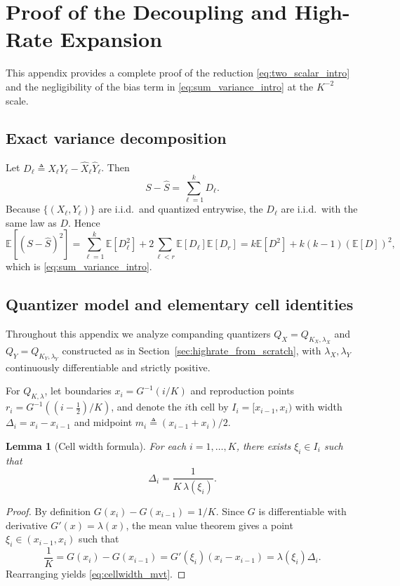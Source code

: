 \documentclass{article}
\newtheorem{lemma}{Lemma}
\newcommand{\E}{\mathbb{E}}
\newcommand{\defeq}{\triangleq}
\begin{document}

\newpage
\appendix

\section{Proof of the Decoupling and High-Rate Expansion}\label{app:proof_decoupling}
This appendix provides a complete proof of the reduction \eqref{eq:two_scalar_intro} and the negligibility of the bias term in \eqref{eq:sum_variance_intro} at the $K^{-2}$ scale.

\subsection{Exact variance decomposition}
Let $D_\ell \defeq X_\ell Y_\ell - \widehat X_\ell \widehat Y_\ell$. Then
\[
S-\widehat S=\sum_{\ell=1}^k D_\ell.
\]
Because $\{(X_\ell,Y_\ell)\}$ are i.i.d.\ and quantized entrywise, the $D_\ell$ are i.i.d.\ with the same law as $D$. Hence
\[
\E[(S-\widehat S)^2]
=\sum_{\ell=1}^k \E[D_\ell^2] + 2\sum_{\ell<r} \E[D_\ell]\E[D_r]
= k\E[D^2] + k(k-1)(\E[D])^2,
\]
which is \eqref{eq:sum_variance_intro}.

\subsection{Quantizer model and elementary cell identities}\label{app:cell_identities}
Throughout this appendix we analyze companding quantizers $Q_X=Q_{K_X,\lambda_X}$ and $Q_Y=Q_{K_Y,\lambda_Y}$ constructed as in Section~\ref{sec:highrate_from_scratch}, with $\lambda_X,\lambda_Y$ continuously differentiable and strictly positive.

For $Q_{K,\lambda}$, let boundaries $x_i=G^{-1}(i/K)$ and reproduction points $r_i=G^{-1}((i-\tfrac12)/K)$, and denote the $i$th cell by $I_i=[x_{i-1},x_i)$ with width $\Delta_i=x_i-x_{i-1}$ and midpoint $m_i\defeq (x_{i-1}+x_i)/2$.

\begin{lemma}[Cell width formula]\label{lem:cellwidth}
For each $i=1,\dots,K$, there exists $\xi_i\in I_i$ such that
\begin{equation}\label{eq:cellwidth_mvt}
\Delta_i=\frac{1}{K\,\lambda(\xi_i)}.
\end{equation}
\end{lemma}
\begin{proof}
By definition $G(x_i)-G(x_{i-1})=1/K$. Since $G$ is differentiable with derivative $G'(x)=\lambda(x)$, the mean value theorem gives a point $\xi_i\in(x_{i-1},x_i)$ such that
\[
\frac{1}{K}=G(x_i)-G(x_{i-1})=G'(\xi_i)(x_i-x_{i-1})=\lambda(\xi_i)\Delta_i.
\]
Rearranging yields \eqref{eq:cellwidth_mvt}.
\end{proof}
\end{document}
